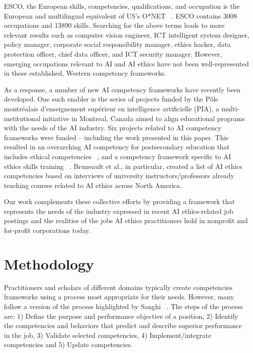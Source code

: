 \documentclass[sigconf]{acmart}
\begin{document}
ESCO, the European skills, competencies, qualifications, and occupation is the European and multilingual equivalent of US's O*NET ~\cite{EuropeanCommission2022}. ESCO contains 3008 occupations and  13890 skills. Searching for the above terms leads to more relevant results such as computer vision engineer, ICT intelligent system designer, policy manager, corporate social responsibility manager, ethics hacker, data protection officer, chief data officer, and ICT security manager. However, emerging occupations relevant to \ac{AI} and \ac{AI} ethics have not been well-represented in these established, Western competency frameworks. 

As a response, a number of new \ac{AI} competency frameworks have recently been developed.
One such enabler is the series of projects funded by the Pôle montréalais d’enseignement supérieur en intelligence artificielle (PIA), a multi-institutional initiative in Montreal, Canada aimed to align educational programs with the needs of the \ac{AI} industry. Six projects related to \ac{AI} competency frameworks were funded -- including the work presented in this paper. This resulted in an overarching \ac{AI} competency for postsecondary education that includes ethical competencies ~\cite{Blok2021}, and a competency framework specific to \ac{AI} ethics skills training ~\cite{Bruneault2022}. Bruneault et al., in particular, created a list of \ac{AI} ethics competencies based on interviews of university instructors/professors already teaching courses related to \ac{AI} ethics across North America. %

Our work complements these collective efforts by providing a framework that represents the needs of the industry expressed in recent \ac{AI} ethics-related job postings and the realities of the jobs \ac{AI} ethics practitioners hold in nonprofit and for-profit corporations today.

\section{Methodology}
Practitioners and scholars of different domains typically create competencies frameworks using a process most appropriate for their needs. However, many follow a version of the process highlighted by Sanghi ~\cite{Sanghi2016}. The steps of the process are: 1) Define the purpose and performance objective of a position, 2) Identify the competencies and behaviors that predict and describe superior performance in the job, 3) Validate selected competencies, 4) Implement/integrate competencies and 5) Update competencies. 
\end{document}
